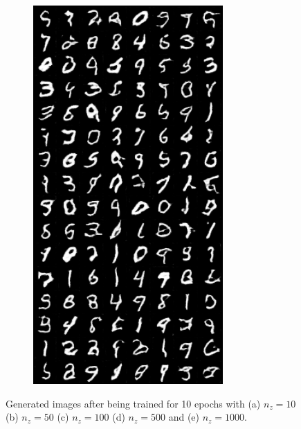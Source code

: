 \begin{figure}[H]
\begin{subfigure}{0.2\textwidth}
        \includegraphics[width=0.95\linewidth]{nz/nz1000_fake_sample_epoch_0010.png}
        \caption{}
        \label{subfig:nz1000}
    \end{subfigure}%
    \caption{Generated images after being trained for 10 epochs with (a) $ n_z = 10 $ (b) $ n_z = 50 $ (c) $ n_z = 100 $ (d) $ n_z = 500 $ and (e) $ n_z = 1000 $.}
    \label{fig:nz}
\end{figure}

